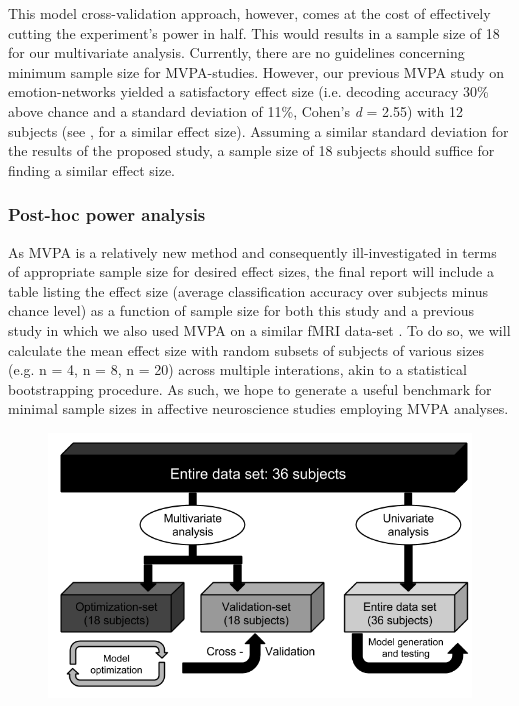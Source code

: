 \documentclass[12pt,a4paper]{article}\usepackage[]{graphicx}\usepackage[]{color}
\begin{document}
This model cross-validation approach, however, comes at the cost of effectively cutting the experiment's power in half. This would results in a sample size of 18 for our multivariate analysis. Currently, there are no guidelines concerning minimum sample size for MVPA-studies. However, our previous MVPA study on emotion-networks \citep{oosterwijk2015} yielded a satisfactory effect size (i.e. decoding accuracy 30\% above chance and a standard deviation of 11\%, Cohen's \emph{d} = 2.55) with 12 subjects (see \citealp{baucom2012}, for a similar effect size). Assuming a similar standard deviation for the results of the proposed study, a sample size of 18 subjects should suffice for finding a similar effect size.

\subsubsection{Post-hoc power analysis}
As MVPA is a relatively new method and consequently ill-investigated in terms of appropriate sample size for desired effect sizes, the final report will include a table listing the effect size (average classification accuracy over subjects minus chance level) as a function of sample size for both this study and a previous study in which we also used MVPA on a similar fMRI data-set \citep{oosterwijk2015}. To do so, we will calculate the mean effect size with random subsets of subjects of various sizes (e.g. n = 4, n = 8, n = 20) across multiple interations, akin to a statistical bootstrapping procedure. As such, we hope to generate a useful benchmark for minimal sample sizes in affective neuroscience studies employing MVPA analyses.   

\begin{figure}[t]
\centering
\includegraphics[scale=.5]{ModelOptimization}
\end{figure}
\end{document}
